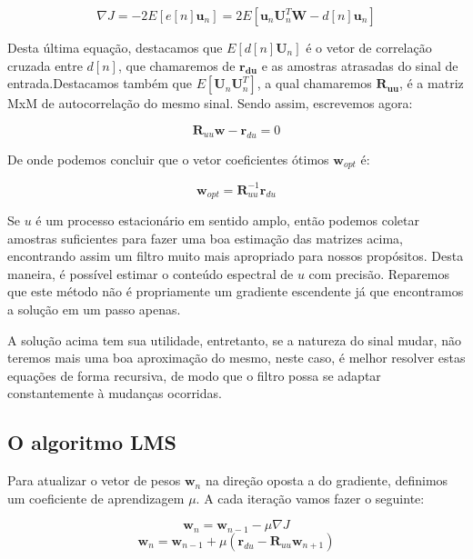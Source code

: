 \documentclass[a4paper, 12pt]{book}
\begin{document}
\begin{equation}
\nabla J=-2 E[e[n]\boldsymbol{u}_n]=2E[\boldsymbol{u}_n\boldsymbol{U}^{T}_n\boldsymbol{W}-d[n]\boldsymbol{u}_n]   
\end{equation}

Desta última equação, destacamos que $E[d[n]\boldsymbol{U}_n]$ é o vetor de correlação cruzada entre $d[n]$, que chamaremos de $\boldsymbol{r_{du}}$ e as amostras atrasadas do sinal de entrada.Destacamos também que $E[\boldsymbol{U}_n\boldsymbol{U}^{T}_n]$, a qual chamaremos $\boldsymbol{R_{uu}}$, é a matriz MxM de autocorrelação do mesmo sinal. Sendo assim, escrevemos agora:

\begin{equation}
\boldsymbol{R}_{uu}\boldsymbol{w}-\boldsymbol{r}_{du}=0
\end{equation}

De onde podemos concluir que o vetor coeficientes ótimos $\boldsymbol{w}_{opt}$ é:

\begin{equation}
\boldsymbol{w}_{opt}=\boldsymbol{R}_{uu}^{-1}\boldsymbol{r}_{du}
\end{equation}

Se $u$ é um processo estacionário em sentido amplo, então podemos coletar amostras suficientes para fazer uma boa estimação das matrizes acima, encontrando assim um filtro muito mais apropriado para nossos propósitos. Desta maneira, é possível estimar o conteúdo espectral de $u$ com precisão. Reparemos que este método não é propriamente um gradiente escendente já que encontramos a solução em um passo apenas.

\indent A solução acima tem sua utilidade, entretanto, se a natureza do sinal mudar, não teremos mais uma boa aproximação do mesmo, neste caso, é melhor resolver estas equações de forma recursiva, de modo que o filtro possa se adaptar constantemente à mudanças ocorridas.  

\subsection{O algoritmo LMS}

Para atualizar o vetor de pesos $\boldsymbol{w}_n$ na direção oposta a do gradiente, definimos um coeficiente de aprendizagem $\mu$. A cada iteração vamos fazer o seguinte:

\begin{equation*}
\boldsymbol{w}_{n}=\boldsymbol{w}_{n-1} - \mu \nabla J
\end{equation*}
\begin{equation}
\boldsymbol{w}_{n}=\boldsymbol{w}_{n-1} + \mu(\boldsymbol{r}_{du}-\boldsymbol{R}_{uu} \boldsymbol{w}_{n+1})
\end{equation}
\end{document}
